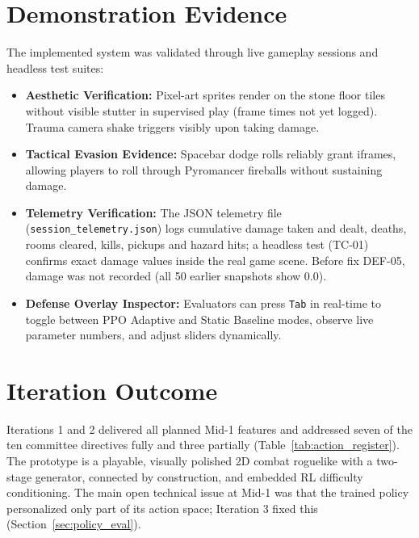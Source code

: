\section{Demonstration Evidence}
The implemented system was validated through live gameplay sessions and headless test suites:
\begin{itemize}
    \item \textbf{Aesthetic Verification:} Pixel-art sprites render on the stone floor tiles without visible stutter in supervised play (frame times not yet logged). Trauma camera shake triggers visibly upon taking damage.
    \item \textbf{Tactical Evasion Evidence:} Spacebar dodge rolls reliably grant iframes, allowing players to roll through Pyromancer fireballs without sustaining damage.
    \item \textbf{Telemetry Verification:} The JSON telemetry file (\texttt{session\_telemetry.json}) logs cumulative damage taken and dealt, deaths, rooms cleared, kills, pickups and hazard hits; a headless test (TC-01) confirms exact damage values inside the real game scene. Before fix DEF-05, damage was not recorded (all 50 earlier snapshots show 0.0).
    \item \textbf{Defense Overlay Inspector:} Evaluators can press \texttt{Tab} in real-time to toggle between PPO Adaptive and Static Baseline modes, observe live parameter numbers, and adjust sliders dynamically.
\end{itemize}

\section{Iteration Outcome}\label{sec:iter12_outcome}
Iterations 1 and 2 delivered all planned Mid-1 features and addressed seven of the ten committee directives fully and three partially (Table~\ref{tab:action_register}). The prototype is a playable, visually polished 2D combat roguelike with a two-stage generator, connected by construction, and embedded RL difficulty conditioning. The main open technical issue at Mid-1 was that the trained policy personalized only part of its action space; Iteration 3 fixed this (Section~\ref{sec:policy_eval}).

